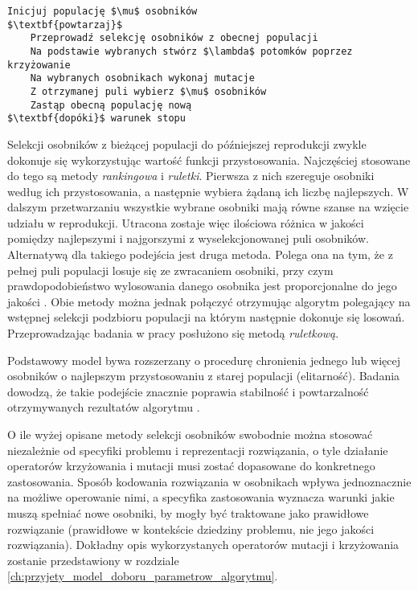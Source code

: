 \begin{lstlisting}[caption=Podstawowy schemat algorytmu genetycznego \cite{gaPackage}, label=lst:genetic_algorithm_psedocode, mathescape]
Inicjuj populację $\mu$ osobników
$\textbf{powtarzaj}$
    Przeprowadź selekcję osobników z obecnej populacji
    Na podstawie wybranych stwórz $\lambda$ potomków poprzez krzyżowanie
    Na wybranych osobnikach wykonaj mutacje
    Z otrzymanej puli wybierz $\mu$ osobników
    Zastąp obecną populację nową
$\textbf{dopóki}$ warunek stopu
\end{lstlisting}
\par
Selekcji osobników z bieżącej populacji do późniejszej reprodukcji zwykle dokonuje się wykorzystując wartość funkcji przystosowania. Najczęściej stosowane do tego są metody \emph{rankingowa} i \emph{ruletki}. Pierwsza z nich szereguje osobniki według ich przystosowania, a następnie wybiera żądaną ich liczbę najlepszych. W dalszym przetwarzaniu wszystkie wybrane osobniki mają równe szanse na wzięcie udziału w reprodukcji. Utracona zostaje więc ilościowa różnica w jakości pomiędzy najlepszymi i najgorszymi z wyselekcjonowanej puli osobników. Alternatywą dla takiego podejścia jest druga metoda. Polega ona na tym, że z pełnej puli populacji losuje się ze zwracaniem osobniki, przy czym prawdopodobieństwo wylosowania danego osobnika jest proporcjonalne do jego jakości \cite{arabas2001wyklady}. Obie metody można jednak połączyć otrzymując algorytm polegający na wstępnej selekcji podzbioru populacji na którym następnie dokonuje się losowań. Przeprowadzając badania w pracy posłużono się metodą \emph{ruletkową}.
\par
Podstawowy model bywa rozszerzany o procedurę chronienia jednego lub więcej osobników o najlepszym przystosowaniu z starej populacji (elitarność). Badania dowodzą, że takie podejście znacznie poprawia stabilność i powtarzalność otrzymywanych rezultatów algorytmu \cite{baluja1995removing}. 
\par
O ile wyżej opisane metody selekcji osobników swobodnie można stosować niezależnie od specyfiki problemu i reprezentacji rozwiązania, o tyle działanie operatorów krzyżowania i mutacji musi zostać dopasowane do konkretnego zastosowania. Sposób kodowania rozwiązania w osobnikach wpływa jednoznacznie na możliwe operowanie nimi, a specyfika zastosowania wyznacza warunki jakie muszą spełniać nowe osobniki, by mogły być traktowane jako prawidłowe rozwiązanie (prawidłowe w kontekście dziedziny problemu, nie jego jakości rozwiązania). Dokładny opis wykorzystanych operatorów mutacji i krzyżowania zostanie przedstawiony w rozdziale \ref{ch:przyjety_model_doboru_parametrow_algorytmu}.
\par

